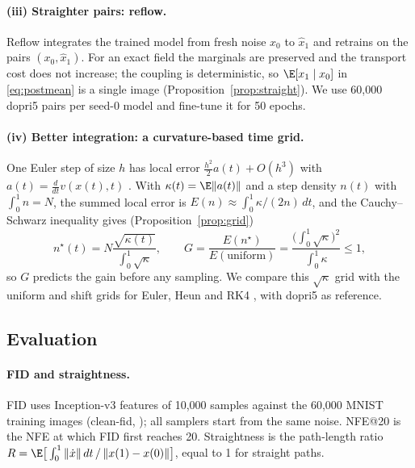 \paragraph{(iii) Straighter pairs: reflow.} Reflow \citep{liu2023rf} integrates the trained model from fresh noise $x_0$ to $\hat x_1$ and retrains on the pairs $(x_0,\hat x_1)$. For an exact field the marginals are preserved and the transport cost does not increase; the coupling is deterministic, so $\E[x_1\mid x_0]$ in \eqref{eq:postmean} is a single image (Proposition~\ref{prop:straight}). We use 60,000 dopri5 pairs per seed-0 model and fine-tune it for 50 epochs.
\paragraph{(iv) Better integration: a curvature-based time grid.} One Euler step of size $h$ has local error $\tfrac{h^2}{2}a(t)+O(h^3)$ with $a(t)=\tfrac{d}{dt}v(x(t),t)$ \citep[\S II.2]{hairer1993ode}. With $\kappa(t)=\E\|a(t)\|$ and a step density $n(t)$ with $\int_0^1n=N$, the summed local error is $E(n)\approx\int_0^1\kappa/(2n)\,dt$, and the Cauchy--Schwarz inequality gives (Proposition~\ref{prop:grid})
\begin{equation}\label{eq:sqrtk}
n^\star(t)=N\frac{\sqrt{\kappa(t)}}{\int_0^1\sqrt\kappa},\qquad
G=\frac{E(n^\star)}{E(\text{uniform})}=\frac{\big(\int_0^1\sqrt\kappa\big)^2}{\int_0^1\kappa}\le1 ,
\end{equation}
so $G$ predicts the gain before any sampling. We compare this $\sqrt\kappa$ grid with the uniform and shift grids \citep{esser2024sd3} for Euler, Heun and RK4 \citep{hairer1993ode}, with dopri5 \citep{dormand1980rk,chen2018node} as reference.

\subsection{Evaluation}\label{sec:eval}
\paragraph{FID and straightness.} FID \citep{heusel2017fid} uses Inception-v3 features \citep{szegedy2016inception} of 10,000 samples against the 60,000 MNIST \citep{lecun1998mnist} training images (clean-fid, \citealp{parmar2022cleanfid}); all samplers start from the same noise. NFE@20 is the NFE at which FID first reaches 20. Straightness is the path-length ratio $R=\E\big[\int_0^1\|\dot x\|\,dt\,/\,\|x(1)-x(0)\|\big]$, equal to 1 for straight paths.
